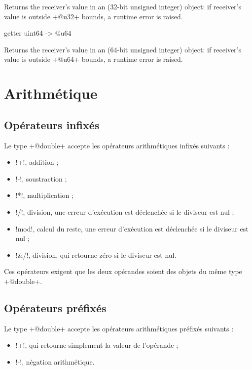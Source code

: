 Returns the receiver's value in an  (32-bit unsigned integer) object: if receiver's value is outside \ggsq+@u32+ bounds, a runtime error is raised.






\begin{galgas4}
getter uint64 -> @u64
\end{galgas4}

Returns the receiver's value in an  (64-bit unsigned integer) object: if receiver's value is outside \ggsq+@u64+ bounds, a runtime error is raised.



\section{Arithmétique}

\subsection{Opérateurs infixés}

Le type \ggsq+@double+ accepte les opérateurs arithmétiques infixés suivants :
\begin{itemize}
  \item \ggsq!+!, addition ;
  \item \ggsq!-!, soustraction ;
  \item \ggsq!*!, multiplication ;
  \item \ggsq!/!, division, une erreur d'exécution est déclenchée si le diviseur est nul ;
  \item \ggsq!mod!, calcul du reste, une erreur d'exécution est déclenchée si le diviseur est nul ;
  \item \ggsq!&/!, division, qui retourne zéro si le diviseur est nul.
\end{itemize}

Ces opérateurs exigent que les deux opérandes soient des objets du même type \ggsq+@double+.

\subsection{Opérateurs préfixés}
Le type \ggsq+@double+ accepte les opérateurs arithmétiques préfixés suivants :
\begin{itemize}
  \item \ggsq!+!, qui retourne simplement la valeur de l'opérande ;
  \item \ggsq!-!, négation arithmétique.
\end{itemize}


